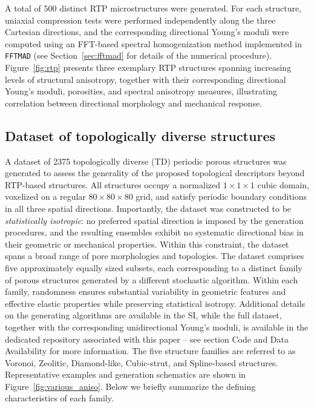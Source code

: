 \documentclass[sn-mathphys,Numbered]{sn-jnl}
\theoremstyle{definition}
\begin{document}
A total of 500 distinct RTP microstructures were generated. For each structure, uniaxial compression tests were performed independently along the three Cartesian directions, and the corresponding directional Young’s moduli were computed using an FFT-based spectral homogenization method implemented in \texttt{FFTMAD} (see Section~\ref{sec:fftmad} for details of the numerical procedure). Figure~\ref{fig:rtp} presents three exemplary RTP structures spanning increasing levels of structural anisotropy, together with their corresponding directional Young’s moduli, porosities, and spectral anisotropy measures, illustrating correlation between directional morphology and mechanical response.

\subsection{Dataset of topologically diverse structures}
\label{sec:td_structures}
A dataset of 2375 topologically diverse (TD) 
periodic porous structures was generated to assess the
generality of the proposed topological descriptors beyond RTP-based structures.
All structures occupy a normalized $1\times1\times1$ cubic domain, voxelized on a
regular $80\times80\times80$ grid, and satisfy periodic boundary conditions in all three spatial
directions.
Importantly, the dataset was constructed to be \emph{statistically isotropic}:
no preferred spatial direction is imposed by the generation procedures, and the
resulting ensembles exhibit no systematic directional bias in their geometric
or mechanical properties.
Within this constraint, the dataset spans a broad range of pore morphologies and
topologies.
The dataset comprises five approximately equally sized subsets, each
corresponding to a distinct family of porous structures generated by a
different stochastic algorithm.
Within each family, randomness ensures substantial variability in geometric
features and effective elastic properties while preserving statistical
isotropy. Additional details on the generating algorithms are available in the SI, while the full dataset, together with the corresponding unidirectional Young’s moduli, is available in the dedicated repository associated with this paper -- see section Code and Data Availability for more information.
The five structure families are referred to as Voronoi, Zeolitic, Diamond-like,
Cubic-strut, and Spline-based structures.
Representative examples and generation schematics are shown in
Figure~\ref{fig:various_aniso}.
Below we briefly summarize the defining characteristics of each family.
\end{document}
